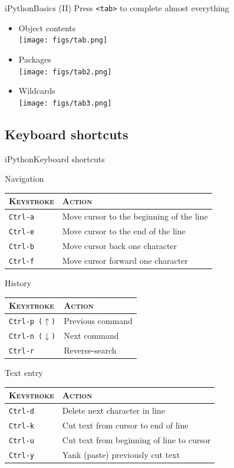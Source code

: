 \documentclass[10pt,compress]{beamer} %
\begin{document}
\begin{frame}{iPython}{Basics (II)}
    Press \texttt{<tab>} to complete almost everything
    \begin{itemize}
        \item Object contents\\
	\texttt{[image: figs/tab.png]} 
        \item Packages\\
	\texttt{[image: figs/tab2.png]}	
        \item Wildcards\\
	\texttt{[image: figs/tab3.png]}	
    \end{itemize}
\end{frame}

\subsection{Keyboard shortcuts}

\begin{frame}{iPython}{Keyboard shortcuts}
    \footnotesize{
        Navigation\\
        \begin{tabular}{ll}\hline
       \textsc{Keystroke} &  \textsc{Action}\\ \hline
	   \texttt{Ctrl-a} & Move cursor to the beginning of the line  \\
	   \texttt{Ctrl-e} & Move cursor to the end of the line  \\
	   \texttt{Ctrl-b} & Move cursor back one character  \\
	   \texttt{Ctrl-f} & Move cursor forward one character  \\\hline
        \end{tabular}

    \bigskip
     History\\
       \begin{tabular}{ll}\hline
       \textsc{Keystroke} &  \textsc{Action}\\ \hline
       \texttt{Ctrl-p ($\uparrow$)} & Previous command  \\
       \texttt{Ctrl-n ($\downarrow$)} & Next command  \\
	   \texttt{Ctrl-r} & Reverse-search  \\\hline
    \end{tabular}

    \bigskip
        Text entry\\
        \begin{tabular}{ll}\hline
       \textsc{Keystroke} &  \textsc{Action}\\ \hline
	   \texttt{Ctrl-d} & Delete next character in line  \\
	   \texttt{Ctrl-k} & Cut text from cursor to end of line  \\
	   \texttt{Ctrl-u} & Cut text from beginning of line to cursor  \\
       \texttt{Ctrl-y} & Yank (paste) previously cut text  \\\hline
       \end{tabular}
   }
\end{frame}
\end{document}
